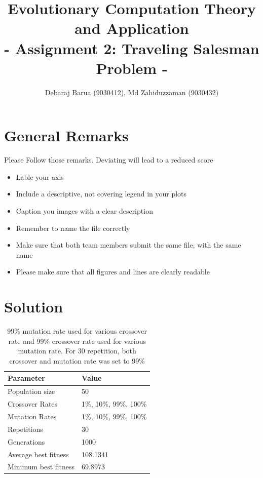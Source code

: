 \documentclass[a4paper, 12pt]{article}
\title{Evolutionary Computation Theory and Application  \\
				- Assignment 2: Traveling Salesman Problem -}
\author{Debaraj Barua (9030412), Md Zahiduzzaman (9030432)}
\date{}
\begin{document}
\maketitle

\section{General Remarks }

Please Follow those remarks. Deviating will lead to a reduced score

\begin{itemize}
	\item Lable your axis 
	\item Include a descriptive, not covering legend in your plots
	\item Caption you images with a clear description
	\item Remember to name the file correctly
	\item Make sure that both team members submit the same file, with the same name
	\item Please make sure that all figures and lines are clearly readable
\end{itemize}

\section{Solution}

\begin{table} [h!]
	  \centering
\begin{tabular}{|l|l|}
\hline
\textbf{Parameter} & \textbf{Value}   \\
\hline
Population size & 50 \\
\hline
Crossover Rates &  1\%, 10\%, 99\%, 100\% \\
\hline
Mutation Rates & 1\%, 10\%, 99\%, 100\% \\
\hline
Repetitions & 30 \\
\hline
Generations & 1000 \\
\hline
Average best fitness		 & 108.1341 \\
\hline
Minimum best fitness		 & 69.8973 \\
\hline
\end{tabular}
\caption{99\% mutation rate used for various crossover rate and 99\% crossover rate used for various mutation rate. For 30 repetition, both crossover and mutation rate was set to 99\% }
\label{table:defparams}
\end{table}
\end{document}
